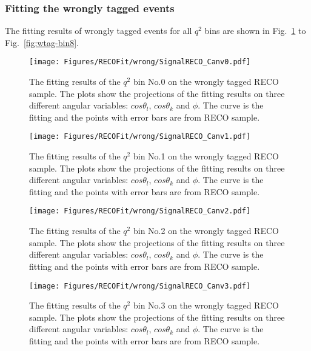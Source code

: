 \clearpage

\subsubsection{Fitting the wrongly tagged events}
\label{sec:fitval-reco-wtag}

The fitting results of wrongly tagged events for all $q^2$ bins are
shown in Fig.~\ref{fig:wtag-bin0} to Fig.~\ref{fig:wtag-bin8}.

\begin{figure}[!hbt]
  \centering
  \texttt{[image: Figures/RECOFit/wrong/SignalRECO\_Canv0.pdf]}
  \caption{The fitting results of the $q^2$ bin No.0 on the wrongly
    tagged RECO sample. The plots show the projections of the fitting
    results on three different angular variables: $cos\theta_l$,
    $cos\theta_k$ and $\phi$. The curve is the fitting and the points
    with error bars are from RECO sample. }
  \label{fig:wtag-bin0}
\end{figure}


\begin{figure}[!hbt]
  \centering
  \texttt{[image: Figures/RECOFit/wrong/SignalRECO\_Canv1.pdf]}
  \caption{The fitting results of the $q^2$ bin No.1 on the wrongly
    tagged RECO  sample. The plots show the projections of the fitting results on
    three different angular variables: $cos\theta_l$, $cos\theta_k$
    and $\phi$. The curve is the fitting and the points with error
    bars are from RECO sample. } 
  \label{fig:wtag-bin1}
\end{figure}

\begin{figure}[!hbt]
  \centering
  \texttt{[image: Figures/RECOFit/wrong/SignalRECO\_Canv2.pdf]}
  \caption{The fitting results of the $q^2$ bin No.2 on the wrongly
    tagged RECO  sample. The plots show the projections of the fitting results on
    three different angular variables: $cos\theta_l$, $cos\theta_k$
    and $\phi$. The curve is the fitting and the points with error
    bars are from RECO sample. } 
  \label{fig:wtag-bin2}
\end{figure}

\begin{figure}[!hbt]
  \centering
  \texttt{[image: Figures/RECOFit/wrong/SignalRECO\_Canv3.pdf]}
  \caption{The fitting results of the $q^2$ bin No.3 on the wrongly
    tagged RECO  sample. The plots show the projections of the fitting results on
    three different angular variables: $cos\theta_l$, $cos\theta_k$
    and $\phi$. The curve is the fitting and the points with error
    bars are from RECO sample. } 
  \label{fig:wtag-bin3}
\end{figure}


